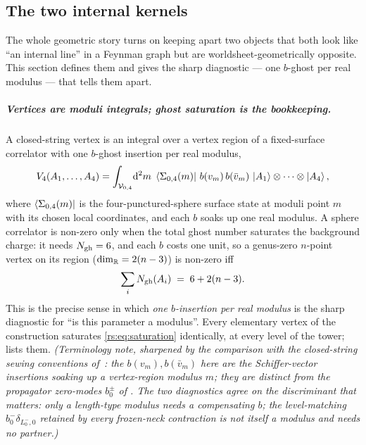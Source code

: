 \subsection{The two internal kernels}
\label{rs:sec:kernels}

The whole geometric story turns on keeping apart two objects that both look like
``an internal line'' in a Feynman graph but are worldsheet-geometrically
opposite. This section defines them and gives the sharp diagnostic --- one
$b$-ghost per real modulus --- that tells them apart.

\subparagraph{Vertices are moduli integrals; ghost saturation is the bookkeeping.}
A closed-string vertex is an integral over a vertex region of a fixed-surface
correlator with one $b$-ghost insertion per real modulus,
\begin{equation}
	V_4(A_1,\dots,A_4)
	= \int_{{\mathcal{V}}_{0,4}}\!\mathrm{d}^2 m\;
	\mathinner{{}_{}\hspace{-2pt}\left \langle \Sigma_{0,4}(m) \right |}\,b(v_m)\,b(\bar v_m)\,
	\ket{A_1}\otimes\cdots\otimes\ket{A_4},
	\label{rs:eq:V4integral}
\end{equation}
where $\mathinner{{}_{}\hspace{-2pt}\left \langle \Sigma_{0,4}(m) \right |}$ is the four-punctured-sphere surface state at moduli
point $m$ with its chosen local coordinates, and each $b$ soaks up one real
modulus. A sphere correlator is non-zero only when the total ghost number
saturates the background charge: it needs $N_{\text{gh}}=6$, and each $b$ costs one unit,
so a genus-zero $n$-point vertex on its region ($\dim_{\mathbb{R}}=2(n-3)$) is non-zero iff
\begin{equation}
	\sum_i N_{\text{gh}}(A_i) \;=\; 6 + 2(n-3).
	\label{rs:eq:saturation}
\end{equation}
This is the precise sense in which \emph{one $b$-insertion per real modulus} is
the sharp diagnostic for ``is this parameter a modulus''. Every elementary vertex
of the construction saturates \eqref{rs:eq:saturation} identically, at every level
of the tower;  lists them. \emph{(Terminology note, sharpened
by the comparison with the closed-string sewing conventions of~\cite{Erbin:2021:StringFieldTheory}: the $b(v_m),b(\bar v_m)$ here are the Schiffer-vector
insertions soaking up a \emph{vertex-region} modulus $m$; they are distinct from
the propagator zero-modes $b_0^\pm$ of . The two diagnostics
agree on the discriminant that matters: only a \emph{length}-type modulus needs a
compensating $b$; the level-matching $b_0^-\delta_{L_0^-,0}$ retained by every
frozen-neck contraction is not itself a modulus and needs no partner.)}

